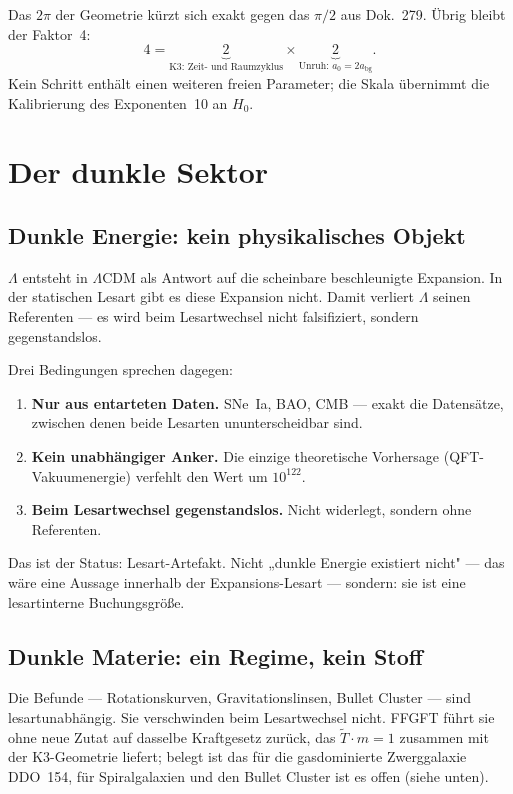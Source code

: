 Das $2\pi$ der Geometrie kürzt sich exakt gegen das $\pi/2$ aus Dok.~279.
Übrig bleibt der Faktor~4:
\[
  4 = \underbrace{2}_{\text{K3: Zeit- und Raumzyklus}}
    \times
    \underbrace{2}_{\text{Unruh: }a_0 = 2a_\text{bg}}.
\]
Kein Schritt enthält einen weiteren freien Parameter; die Skala übernimmt
die Kalibrierung des Exponenten~10 an $H_0$.

\chapter{Der dunkle Sektor}

\section{Dunkle Energie: kein physikalisches Objekt}

$\Lambda$ entsteht in $\Lambda$CDM als Antwort auf die scheinbare
beschleunigte Expansion. In der statischen Lesart gibt es diese Expansion
nicht. Damit verliert $\Lambda$ seinen Referenten — es wird beim
Lesartwechsel nicht falsifiziert, sondern gegenstandslos.

Drei Bedingungen sprechen dagegen:

\begin{enumerate}
  \item \textbf{Nur aus entarteten Daten.} SNe~Ia, BAO, CMB — exakt die
        Datensätze, zwischen denen beide Lesarten ununterscheidbar sind.
  \item \textbf{Kein unabhängiger Anker.} Die einzige theoretische
        Vorhersage (QFT-Vakuumenergie) verfehlt den Wert um $10^{122}$.
  \item \textbf{Beim Lesartwechsel gegenstandslos.} Nicht widerlegt,
        sondern ohne Referenten.
\end{enumerate}

Das ist der Status: Lesart-Artefakt. Nicht „dunkle Energie existiert
nicht" — das wäre eine Aussage innerhalb der Expansions-Lesart —
sondern: sie ist eine lesartinterne Buchungsgröße.

\section{Dunkle Materie: ein Regime, kein Stoff}

Die Befunde — Rotationskurven, Gravitationslinsen, Bullet Cluster —
sind lesartunabhängig. Sie verschwinden beim Lesartwechsel nicht.
FFGFT führt sie ohne neue Zutat auf dasselbe Kraftgesetz zurück,
das $\tilde T \cdot m = 1$ zusammen mit der K3-Geometrie liefert; belegt
ist das für die gasdominierte Zwerggalaxie DDO~154, für Spiralgalaxien und
den Bullet Cluster ist es offen (siehe unten).

